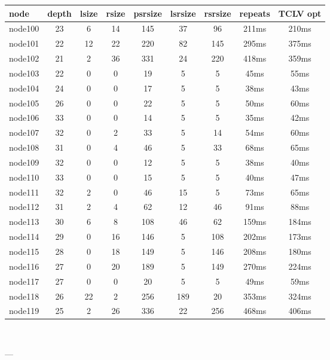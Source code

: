 \begin{tabular}{|l|c|c|c|c|c|c|c|c|}
\hline node & depth & lsize & rsize & psrsize & lsrsize & rsrsize   & repeats & TCLV opt\\
    \hline node100 & 23 & 6 & 14 & 145 & 37 & 96 & 211ms & 210ms\\
    \hline node101 & 22 & 12 & 22 & 220 & 82 & 145 & 295ms & 375ms\\
    \hline node102 & 21 & 2 & 36 & 331 & 24 & 220 & 418ms & 359ms\\
    \hline node103 & 22 & 0 & 0 & 19 & 5 & 5 & 45ms & 55ms\\
    \hline node104 & 24 & 0 & 0 & 17 & 5 & 5 & 38ms & 43ms\\
    \hline node105 & 26 & 0 & 0 & 22 & 5 & 5 & 50ms & 60ms\\
    \hline node106 & 33 & 0 & 0 & 14 & 5 & 5 & 35ms & 42ms\\
    \hline node107 & 32 & 0 & 2 & 33 & 5 & 14 & 54ms & 60ms\\
    \hline node108 & 31 & 0 & 4 & 46 & 5 & 33 & 68ms & 65ms\\
    \hline node109 & 32 & 0 & 0 & 12 & 5 & 5 & 38ms & 40ms\\
    \hline node110 & 33 & 0 & 0 & 15 & 5 & 5 & 40ms & 47ms\\
    \hline node111 & 32 & 2 & 0 & 46 & 15 & 5 & 73ms & 65ms\\
    \hline node112 & 31 & 2 & 4 & 62 & 12 & 46 & 91ms & 88ms\\
    \hline node113 & 30 & 6 & 8 & 108 & 46 & 62 & 159ms & 184ms\\
    \hline node114 & 29 & 0 & 16 & 146 & 5 & 108 & 202ms & 173ms\\
    \hline node115 & 28 & 0 & 18 & 149 & 5 & 146 & 208ms & 180ms\\
    \hline node116 & 27 & 0 & 20 & 189 & 5 & 149 & 270ms & 224ms\\
    \hline node117 & 27 & 0 & 0 & 20 & 5 & 5 & 49ms & 59ms\\
    \hline node118 & 26 & 22 & 2 & 256 & 189 & 20 & 353ms & 324ms\\
    \hline node119 & 25 & 2 & 26 & 336 & 22 & 256 & 468ms & 406ms\\

\hline
\end{tabular} \

---


